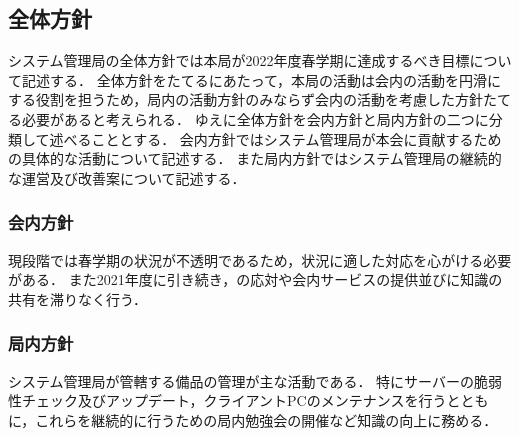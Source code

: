 \subsection*{全体方針}

システム管理局の全体方針では本局が2022年度春学期に達成するべき目標について記述する．
全体方針をたてるにあたって，本局の活動は会内の活動を円滑にする役割を担うため，局内の活動方針のみならず会内の活動を考慮した方針たてる必要があると考えられる．
ゆえに全体方針を会内方針と局内方針の二つに分類して述べることとする．
会内方針ではシステム管理局が本会に貢献するための具体的な活動について記述する．
また局内方針ではシステム管理局の継続的な運営及び改善案について記述する．

\subsubsection*{会内方針}
現段階では春学期の状況が不透明であるため，状況に適した対応を心がける必要がある．
また2021年度に引き続き，\firstGrade{}の応対や会内サービスの提供並びに知識の共有を滞りなく行う．

\subsubsection*{局内方針}
システム管理局が管轄する備品の管理が主な活動である．
特にサーバーの脆弱性チェック及びアップデート，クライアントPCのメンテナンスを行うとともに，これらを継続的に行うための局内勉強会の開催など知識の向上に務める．
